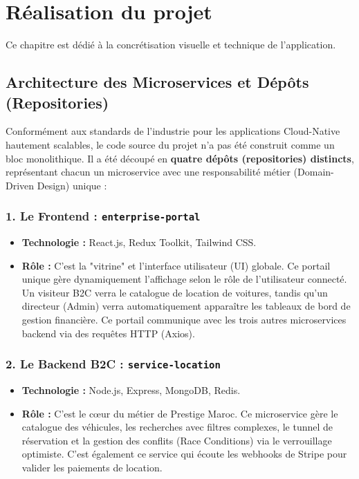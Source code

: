\chapter{Réalisation du projet}

Ce chapitre est dédié à la concrétisation visuelle et technique de l'application.

\section{Architecture des Microservices et Dépôts (Repositories)}
Conformément aux standards de l'industrie pour les applications Cloud-Native hautement scalables, le code source du projet n'a pas été construit comme un bloc monolithique. Il a été découpé en \textbf{quatre dépôts (repositories) distincts}, représentant chacun un microservice avec une responsabilité métier (Domain-Driven Design) unique :

\subsection{1. Le Frontend : \texttt{enterprise-portal}}
\begin{itemize}
    \item \textbf{Technologie :} React.js, Redux Toolkit, Tailwind CSS.
    \item \textbf{Rôle :} C'est la "vitrine" et l'interface utilisateur (UI) globale. Ce portail unique gère dynamiquement l'affichage selon le rôle de l'utilisateur connecté. Un visiteur B2C verra le catalogue de location de voitures, tandis qu'un directeur (Admin) verra automatiquement apparaître les tableaux de bord de gestion financière. Ce portail communique avec les trois autres microservices backend via des requêtes HTTP (Axios).
\end{itemize}

\subsection{2. Le Backend B2C : \texttt{service-location}}
\begin{itemize}
    \item \textbf{Technologie :} Node.js, Express, MongoDB, Redis.
    \item \textbf{Rôle :} C'est le cœur du métier de Prestige Maroc. Ce microservice gère le catalogue des véhicules, les recherches avec filtres complexes, le tunnel de réservation et la gestion des conflits (Race Conditions) via le verrouillage optimiste. C'est également ce service qui écoute les webhooks de Stripe pour valider les paiements de location.
\end{itemize}

